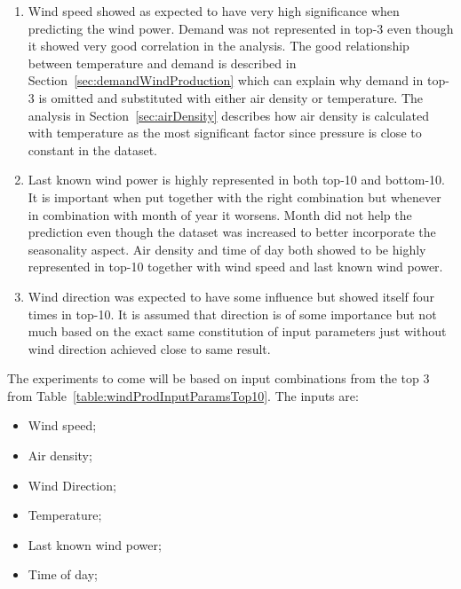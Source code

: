\begin{enumerate}
\item Wind speed showed as expected to have very high significance when predicting the wind power. Demand was not represented in top-3 even though it showed very good correlation in the analysis. The good relationship between temperature and demand is described in Section~\ref{sec:demandWindProduction} which can explain why demand in top-3 is omitted and substituted with either air density or temperature. The analysis in Section~\ref{sec:airDensity} describes how air density is calculated with temperature as the most significant factor since pressure is close to constant in the dataset.   
\item Last known wind power is highly represented in both top-10 and bottom-10. It is important when put together with the right combination but whenever in combination with month of year it worsens. Month did not help the prediction even though the dataset was increased to better incorporate the seasonality aspect. Air density and time of day both showed to be highly represented in top-10 together with wind speed and last known wind power.
\item Wind direction was expected to have some influence but showed itself four times in top-10. It is assumed that direction is of some importance but not much based on the exact same constitution of input parameters just without wind direction achieved close to same result.
\end{enumerate}

The experiments to come will be based on input combinations from the top 3 from Table~\ref{table:windProdInputParamsTop10}. The inputs are:
\begin{itemize}
\item Wind speed;
\item Air density;
\item Wind Direction;
\item Temperature;
\item Last known wind power;
\item Time of day;
\end{itemize}
\newpage
